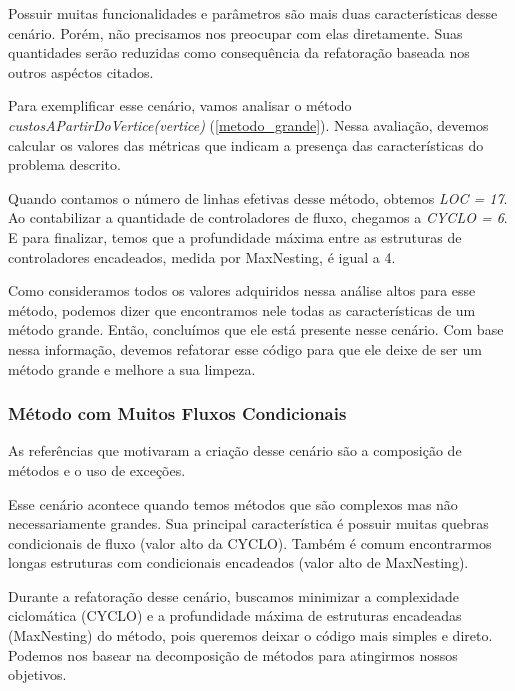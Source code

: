 	Possuir muitas funcionalidades e parâmetros são mais duas características desse cenário. Porém, não precisamos nos preocupar com elas diretamente. Suas quantidades serão reduzidas como consequência da refatoração baseada nos outros aspéctos citados.

   	Para exemplificar esse cenário, vamos analisar o método \textit{custosAPartirDoVertice(vertice)} (\ref{metodo_grande}). Nessa avaliação, devemos calcular os valores das métricas que indicam a presença das características do problema descrito. 
    
                                      
          
	Quando contamos o número de linhas efetivas desse método, obtemos \textit{LOC = 17}. Ao contabilizar a quantidade de controladores de fluxo, chegamos a \textit{CYCLO = 6}. E para finalizar, temos que a profundidade máxima entre as estruturas de controladores encadeados, medida por MaxNesting, é igual a 4. 
	
	Como consideramos todos os valores adquiridos nessa análise altos para esse método, podemos dizer que encontramos nele todas as características de um método grande. Então, concluímos que ele está presente nesse cenário. Com base nessa informação, devemos refatorar esse código para que ele deixe de ser um método grande e melhore a sua limpeza.
	
	
\subsubsection{Método com Muitos Fluxos Condicionais}

	As referências que motivaram a criação desse cenário são a composição de métodos e o uso de exceções.
	
	Esse cenário acontece quando temos métodos que são complexos mas não necessariamente grandes. Sua principal característica é possuir muitas quebras condicionais de fluxo (valor alto da CYCLO). Também é comum encontrarmos longas estruturas com condicionais encadeados (valor alto de MaxNesting).
	
	Durante a refatoração desse cenário, buscamos minimizar a complexidade ciclomática (CYCLO) e a profundidade máxima de estruturas encadeadas (MaxNesting) do método, pois queremos deixar o código mais simples e direto. Podemos nos basear na decomposição de métodos para atingirmos nossos objetivos.
	
